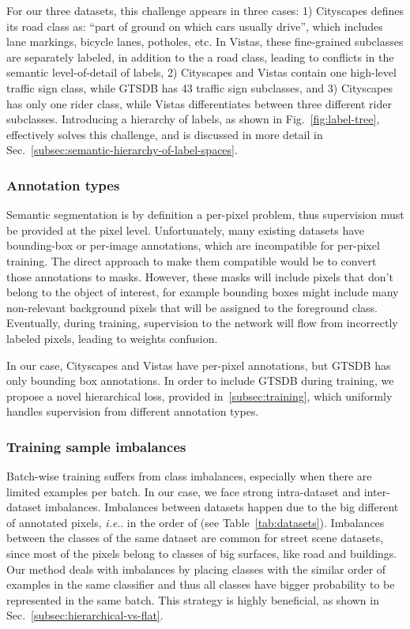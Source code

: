 \documentclass[letterpaper, 10 pt, conference]{ieeeconf}
\makeatletter
\DeclareRobustCommand\onedot{\futurelet\@let@token\@onedot}
\def\@onedot{\ifx\@let@token.\else.\null\fi\xspace}
\def\ie{\emph{i.e}\onedot}
\makeatother
\begin{document}
For our three datasets, this challenge appears in three cases: 1) Cityscapes defines its road class as: ``part of ground on which cars usually drive'', which includes lane markings, bicycle lanes, potholes, etc. In Vistas, these fine-grained subclasses are separately labeled, in addition to the a road class, leading to conflicts in the semantic level-of-detail of labels, 2) Cityscapes and Vistas contain one high-level traffic sign class, while GTSDB has 43 traffic sign subclasses, and 3) Cityscapes has only one rider class, while Vistas differentiates between three different rider subclasses. Introducing a hierarchy of labels, as shown in Fig.~\ref{fig:label-tree}, effectively solves this challenge, and is discussed in more detail in Sec.~\ref{subsec:semantic-hierarchy-of-label-spaces}.

\subsubsection*{\textbf{Annotation types}}
\label{sec:annotation-types}
Semantic segmentation is by definition a per-pixel problem, thus supervision must be provided at the pixel level. Unfortunately, many existing datasets have bounding-box or per-image annotations, which are incompatible for per-pixel training. The direct approach to make them compatible would be to convert those annotations to masks. However, these masks will include pixels that don't belong to the object of interest, for example bounding boxes might include many non-relevant background pixels that will be assigned to the foreground class. Eventually, during training, supervision to the network will flow from incorrectly labeled pixels, leading to weights confusion.

In our case, Cityscapes and Vistas have per-pixel annotations, but GTSDB has only bounding box annotations. In order to include GTSDB during training, we propose a novel hierarchical loss, provided in~\ref{subsec:training}, which uniformly handles supervision from different annotation types.

\subsubsection*{\textbf{Training sample imbalances}}
\label{sec:sample-imbalances}
Batch-wise training suffers from class imbalances, especially when there are limited examples per batch. In our case, we face strong intra-dataset and inter-dataset imbalances. Imbalances between datasets happen due to the big different of annotated pixels, \ie in the order of  (see Table~\ref{tab:datasets}). Imbalances between the classes of the same dataset are common for street scene datasets, since most of the pixels belong to classes of big surfaces, like road and buildings. Our method deals with imbalances by placing classes with the similar order of examples in the same classifier and thus all classes have bigger probability to be represented in the same batch. This strategy is highly beneficial, as shown in Sec.~\ref{subsec:hierarchical-vs-flat}.
\end{document}
